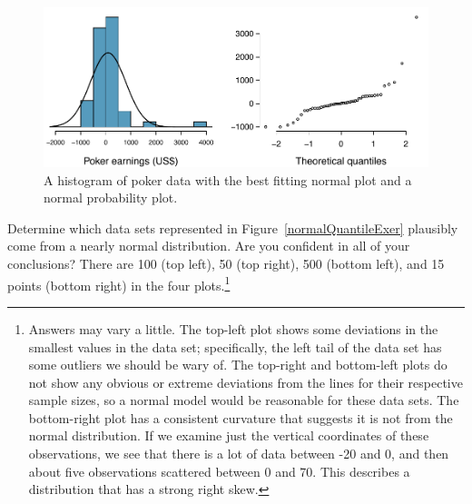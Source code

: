 \begin{figure}
\centering
\includegraphics[width=\textwidth]{ch_distributions/figures/pokerNormal/pokerNormal}
\caption{A histogram of poker data with the best fitting normal plot and a normal probability plot.}
\label{pokerNormal}
\end{figure}

\begin{exercise}\label{normalQuantileExercise}
Determine which data sets represented in Figure~\ref{normalQuantileExer} plausibly come from a nearly normal distribution. Are you confident in all of your conclusions? There are 100 (top left), 50 (top right), 500 (bottom left), and 15 points (bottom right) in the four plots.\footnote{Answers may vary a little. The top-left plot shows some deviations in the smallest values in the data set; specifically, the left tail of the data set has some outliers we should be wary of. The top-right and bottom-left plots do not show any obvious or extreme deviations from the lines for their respective sample sizes, so a normal model would be reasonable for these data sets. The bottom-right plot has a consistent curvature that suggests it is not from the normal distribution. If we examine just the vertical coordinates of these observations, we see that there is a lot of data between -20 and 0, and then about five observations scattered between 0 and 70. This describes a distribution that has a strong right skew.}
\end{exercise}

